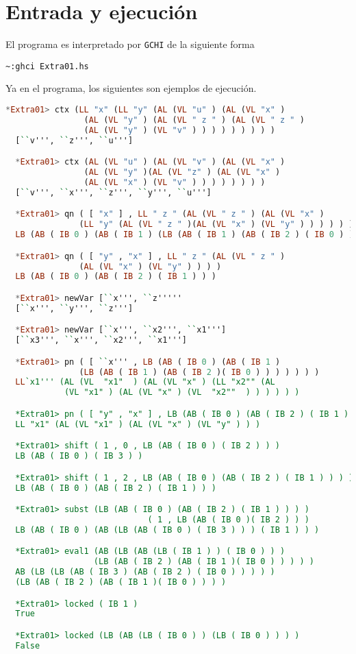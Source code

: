 \documentclass[spanish,12pt,letterpaper]{article}
\begin{document}
\section{Entrada y ejecución}

El programa es interpretado por \texttt{GCHI} de la siguiente forma
\begin{lstlisting}[]
  ~:ghci Extra01.hs
\end{lstlisting}

Ya en el programa, los siguientes son ejemplos de ejecución.
\begin{lstlisting}[language=Haskell]
  *Extra01> ctx (LL "x" (LL "y" (AL (VL "u" ) (AL (VL "x" ) 
                (AL (VL "y" ) (AL (VL " z " ) (AL (VL " z " ) 
                (AL (VL "y" ) (VL "v" ) ) ) ) ) ) ) ) )
  [``v''', ``z''', ``u''']

  *Extra01> ctx (AL (VL "u" ) (AL (VL "v" ) (AL (VL "x" ) 
                (AL (VL "y" )(AL (VL "z" ) (AL (VL "x" ) 
                (AL (VL "x" ) (VL "v" ) ) ) ) ) ) ) )
  [``v''', ``x''', ``z''', ``y''', ``u''']

  *Extra01> qn ( [ "x" ] , LL " z " (AL (VL " z " ) (AL (VL "x" ) 
               (LL "y" (AL (VL " z " )(AL (VL "x" ) (VL "y" ) ) ) ) ) ) )
  LB (AB ( IB 0 ) (AB ( IB 1 ) (LB (AB ( IB 1 ) (AB ( IB 2 ) ( IB 0 ) ) ) ) ) )

  *Extra01> qn ( [ "y" , "x" ] , LL " z " (AL (VL " z " ) 
               (AL (VL "x" ) (VL "y" ) ) ) )
  LB (AB ( IB 0 ) (AB ( IB 2 ) ( IB 1 ) ) )

  *Extra01> newVar [``x''', ``z'''''
  [``x''', ``y''', ``z''']

  *Extra01> newVar [``x''', ``x2''', ``x1''']
  [``x3''', ``x''', ``x2''', ``x1''']

  *Extra01> pn ( [ ``x''' , LB (AB ( IB 0 ) (AB ( IB 1 ) 
               (LB (AB ( IB 1 ) (AB ( IB 2 )( IB 0 ) ) ) ) ) ) )
  LL`x1''' (AL (VL  "x1"  ) (AL (VL "x" ) (LL "x2"" (AL
            (VL "x1" ) (AL (VL "x" ) (VL  "x2""  ) ) ) ) ) )

  *Extra01> pn ( [ "y" , "x" ] , LB (AB ( IB 0 ) (AB ( IB 2 ) ( IB 1 ) ) ) )
  LL "x1" (AL (VL "x1" ) (AL (VL "x" ) (VL "y" ) ) )

  *Extra01> shift ( 1 , 0 , LB (AB ( IB 0 ) ( IB 2 ) ) )
  LB (AB ( IB 0 ) ( IB 3 ) )

  *Extra01> shift ( 1 , 2 , LB (AB ( IB 0 ) (AB ( IB 2 ) ( IB 1 ) ) ) )
  LB (AB ( IB 0 ) (AB ( IB 2 ) ( IB 1 ) ) )

  *Extra01> subst (LB (AB ( IB 0 ) (AB ( IB 2 ) ( IB 1 ) ) ) ) 
                             ( 1 , LB (AB ( IB 0 )( IB 2 ) ) )
  LB (AB ( IB 0 ) (AB (LB (AB ( IB 0 ) ( IB 3 ) ) ) ( IB 1 ) ) )

  *Extra01> eval1 (AB (LB (AB (LB ( IB 1 ) ) ( IB 0 ) ) ) 
                  (LB (AB ( IB 2 ) (AB ( IB 1 )( IB 0 ) ) ) ) )
  AB (LB (LB (AB ( IB 3 ) (AB ( IB 2 ) ( IB 0 ) ) ) ) ) 
  (LB (AB ( IB 2 ) (AB ( IB 1 )( IB 0 ) ) ) )

  *Extra01> locked ( IB 1 )
  True

  *Extra01> locked (LB (AB (LB ( IB 0 ) ) (LB ( IB 0 ) ) ) )
  False

\end{lstlisting}
\end{document}
